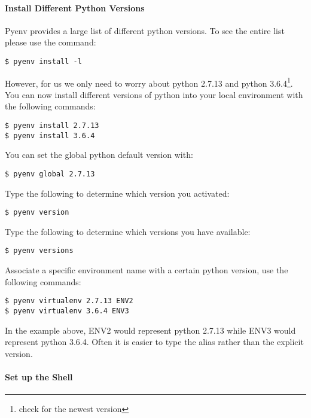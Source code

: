 \paragraph{Install Different Python
Versions}\label{install-different-python-versions}

Pyenv provides a large list of different python versions. To see the
entire list please use the command:

\begin{verbatim}
$ pyenv install -l
\end{verbatim}

However, for us we only need to worry about python 2.7.13 and python
3.6.4\footnote{check
  for the newest version}. You can now
install different versions of python into your local environment with
the following commands:

\begin{verbatim}
$ pyenv install 2.7.13
$ pyenv install 3.6.4
\end{verbatim}

You can set the global python default version with:

\begin{verbatim}
$ pyenv global 2.7.13
\end{verbatim}

Type the following to determine which version you activated:

\begin{verbatim}
$ pyenv version
\end{verbatim}

Type the following to determine which versions you have available:

\begin{verbatim}
$ pyenv versions
\end{verbatim}

Associate a specific environment name with a certain python version, use
the following commands:

\begin{verbatim}
$ pyenv virtualenv 2.7.13 ENV2
$ pyenv virtualenv 3.6.4 ENV3
\end{verbatim}

In the example above, ENV2 would represent python 2.7.13 while ENV3
would represent python 3.6.4. Often it is easier to type the alias
rather than the explicit version.

\paragraph{Set up the Shell}\label{set-up-the-shell}

